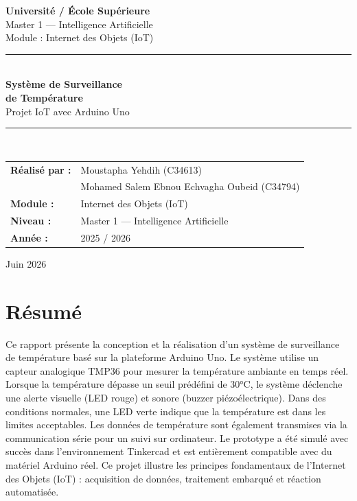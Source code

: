 \documentclass[12pt, a4paper]{article}
\begin{document}
\begin{titlepage}
    \centering
    \vspace*{2cm}

    {\Large \textbf{Université / École Supérieure}}\\[0.5cm]
    {\large Master 1 — Intelligence Artificielle}\\[0.3cm]
    {\large Module : Internet des Objets (IoT)}\\[2cm]

    \rule{\textwidth}{1pt}\\[0.5cm]
    {\Huge \textbf{Système de Surveillance\\de Température}}\\[0.3cm]
    {\Large Projet IoT avec Arduino Uno}\\[0.5cm]
    \rule{\textwidth}{1pt}\\[2cm]

    {\large
    \begin{tabular}{ll}
        \textbf{Réalisé par :} & Moustapha Yehdih (C34613) \\
                               & Mohamed Salem Ebnou Echvagha Oubeid (C34794) \\[1cm]
        \textbf{Module :}      & Internet des Objets (IoT) \\
        \textbf{Niveau :}      & Master 1 — Intelligence Artificielle \\
        \textbf{Année :}       & 2025 / 2026 \\
    \end{tabular}
    }

    \vfill
    {\large Juin 2026}
\end{titlepage}

\tableofcontents
\newpage

\section*{Résumé}

Ce rapport présente la conception et la réalisation d'un système de surveillance de température basé sur la plateforme Arduino Uno. Le système utilise un capteur analogique TMP36 pour mesurer la température ambiante en temps réel. Lorsque la température dépasse un seuil prédéfini de 30°C, le système déclenche une alerte visuelle (LED rouge) et sonore (buzzer piézoélectrique). Dans des conditions normales, une LED verte indique que la température est dans les limites acceptables. Les données de température sont également transmises via la communication série pour un suivi sur ordinateur. Le prototype a été simulé avec succès dans l'environnement Tinkercad et est entièrement compatible avec du matériel Arduino réel. Ce projet illustre les principes fondamentaux de l'Internet des Objets (IoT) : acquisition de données, traitement embarqué et réaction automatisée.
\end{document}

